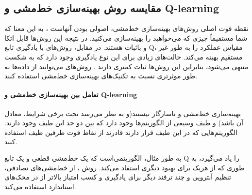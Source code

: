 \subsection{مقایسه روش بهینه‌سازی خط‌مشی و Q-learning}
نقطه قوت اصلی روش‌های بهینه‌سازی خط‌مشی، اصولی بودن آنهاست ، به این معنا که شما مستقیماً چیزی که می‌خواهید را بهینه‌سازی می‌کنید. در نتیجه این روش‌ها قابل اتکا و باثبات هستند. در مقابل، روش‌های 
با یادگیری تابع Q، مقیاس عملکرد را به طور غیر مستقیم بهینه می‌کند. حالت‌های زیادی برای این نوع یادگیری وجود دارد که به شکست منتهی می‌شود، بنابراین این روش‌ها  ثبات کمتری دارند 
\cite{suttonbook}.
روش‌های 
 می‌توانند از داده‌ها به طور موثرتری نسبت به تکنیک‌های بهینه‌سازی خط‌مشی استفاده کنند.
\paragraph{تعامل بین بهینه‌سازی خط‌مشی و Q-learning}
 بهینه‌سازی خط‌مشی و
 ناسازگار نیستند(و به نظر می‌رسد تحت برخی شرایط، معادل آن باشد) و طیف وسیعی از الگوریتم‌ها وجود دارد که بین دو حد این طیف وجود دارند. الگوریتم‌هایی که در این طیف قرار دارند قادرند از نقاط قوت  طرفین طیف استفاده کنند.
 
  به طور مثال، 
 الگوریتمی‌است که  یک خط‌مشی قطعی و یک تابع Q را یاد می‌گیرد،
 به طوری که از هریک  برای بهبود دیگری استفاد می‌کند. روش
 ،
   از خط‌مشی‌های تصادفی، تنظیم آنتروپی  و چند ترفند دیگر برای  یادگیری و کسب امتیاز بالاتر از 
    در محک‌های استاندارد
    استفاده می‌کند.


